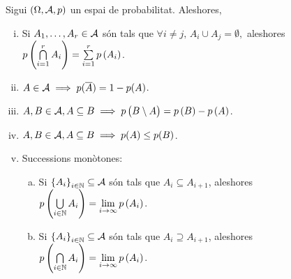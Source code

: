 \begin{prop}
    Sigui $(\Omega,\mathcal{A}, p)$ un espai de probabilitat. Aleshores,
    \begin{enumerate}[i)]
        \item Si $A_1, \dots, A_r \in \mathcal{A}$ són tals que $\forall i\neq j,\, A_i \cup A_j = \emptyset,$ aleshores 
	  $p\left( \bigcap\limits_{i=1}^{r} A_i \right)= \sum\limits_{i=1}^{r} p\left( A_i \right)$.
        \item \label{item:esp_prob_2}$A \in \mathcal{A} \implies p(\overline{A})=1-p(A)$.
        \item \label{item:esp_prob_3}$A,B \in \mathcal{A}, A \subseteq B \implies p\left( B\setminus A \right) = p\left( B\right) - p\left( A\right)$.
        \item $A,B \in \mathcal{A}, A \subseteq B \implies p(A) \le p(B)$.
        \item \label{item:esp_prob_5}Successions monòtones:
        \begin{enumerate}[a)]
         \item Si $\left\{A_i\right\}_{i\in\mathbb{N}} \subseteq \mathcal{A}$ són tals que $A_i\subseteq A_{i+1}$, aleshores $p\left( \bigcup\limits_{i\in\mathbb{N}} A_i\right) = \lim\limits_{i\to\infty} p\left( A_i\right)$.
         \item Si $\left\{A_i\right\}_{i\in\mathbb{N}} \subseteq \mathcal{A}$ són tals que $A_i\supseteq A_{i+1}$, aleshores $p\left( \bigcap\limits_{i\in\mathbb{N}} A_i\right) = \lim\limits_{i\to\infty} p\left( A_i\right)$.
        \end{enumerate}
    \end{enumerate}
\end{prop}

